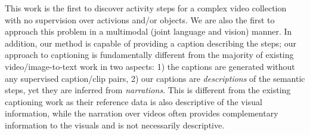 This work is the first to discover activity steps for a complex video collection with no supervision over activions and/or objects. We are also the first to approach this problem in a multimodal (joint language and vision) manner. In addition, our method is capable of providing a caption describing the steps; our approach to captioning is fundamentally different from the majority of existing video/image-to-text work in two aspects: 1) the captions are generated without any supervised caption/clip pairs, 2) our captions are \emph{descriptions} of the semantic steps, yet they are inferred from \emph{narrations}. This is different from the existing captioning work as their reference data is also descriptive of the visual information, while the narration over videos often provides complementary information to the visuals and is not necessarily descriptive.



